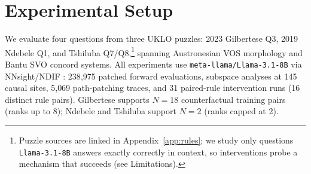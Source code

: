 \section{Experimental Setup}
\label{sec:setup}

We evaluate four questions from three UKLO puzzles: 2023 Gilbertese Q3,
2019 Ndebele Q1, and Tshiluba Q7/Q8,\footnote{Puzzle sources are linked in
Appendix~\ref{app:rules}; we study only questions \texttt{Llama-3.1-8B}
answers exactly correctly in context, so interventions probe a mechanism
that succeeds (see Limitations).} spanning Austronesian VOS morphology and
Bantu SVO concord systems. All experiments use
\texttt{meta-llama/Llama-3.1-8B} \citep{grattafiori2024} via NNsight/NDIF
\citep{fiottokaufman2025}: 238{,}975 patched forward evaluations, subspace
analyses at 145 causal sites, 5{,}069 path-patching traces, and 31
paired-rule intervention runs (16 distinct rule pairs). Gilbertese
supports $N{=}18$ counterfactual training pairs (ranks up to 8); Ndebele
and Tshiluba support $N{=}2$ (ranks capped at 2).
